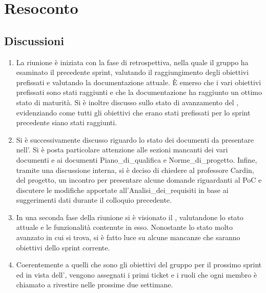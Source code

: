 \section{Resoconto} \label{sec:resoconto}
\subsection{Discussioni} \label{subsec:resdiscussione}
\begin{enumerate}
    \item La riunione è iniziata con la fase di retrospettiva, nella quale il gruppo ha esaminato il precedente sprint, valutando il raggiungimento degli obiettivi prefissati e valutando la documentazione attuale.
    È emerso che i vari obiettivi prefissati sono stati raggiunti e che la documentazione ha raggiunto un ottimo stato di maturità. Si è inoltre discusso sullo stato di avanzamento del , evidenziando come tutti gli obiettivi che erano stati prefissati per lo sprint precedente siano stati raggiunti.
    \item Si è successivamente discusso riguardo lo stato dei documenti da presentare nell'. Si è posta particolare attenzione alle sezioni mancanti dei vari documenti e ai documenti Piano_di_qualifica e Norme_di_progetto. 
    Infine, tramite una discussione interna, si è deciso di chiedere al professore Cardin,  del progetto, un incontro per presentare alcune domande riguardanti al PoC e discutere le modifiche apportate all'Analisi_dei_requisiti in base ai suggerimenti dati durante il colloquio precedente.
    \item In una seconda fase della riunione si è visionato il , valutandone lo stato attuale e le funzionalità contenute in esso. Nonostante lo stato molto avanzato in cui si trova, si è fatto luce su alcune mancanze che saranno obiettivi dello sprint corrente.
    \item Coerentemente a quelli che sono gli obiettivi del gruppo per il prossimo sprint ed in vista dell', vengono assegnati i primi ticket e i ruoli che ogni membro è chiamato a rivestire nelle prossime due settimane.
\end{enumerate}

